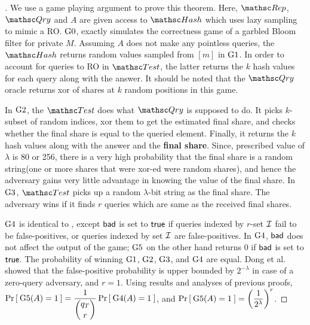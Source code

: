 \begin{proof}[]
We use a game playing argument to prove this theorem. Here, $\Rep$, $\Qry$ and $A$ are given access to $\Hash$ which uses lazy sampling to mimic a RO. $\text{G0}$, exactly simulates the correctness game of a garbled Bloom filter for private $M$. Assuming $A$ does not make any pointless queries, the $\Hash$ returns random values sampled from $[m]$ in $\text{G1}$. In order to account for queries to RO in $\Test$, the latter returns the $k$ hash values for each query along with the answer. It should be noted that the $\Qry$ oracle returns xor of shares at $k$ random positions in this game. 

In $\text{G2}$, the $\Test$ does what $\Qry$ is supposed to do. It picks $k$-subset of random indices, xor them to get the estimated final share, and checks whether the final share is equal to the queried element. Finally, it returns the $k$ hash values along with the answer and the \textbf{final share}. Since, prescribed value of $\lambda$ is 80 or 256, there is a very high probability that the final share is a random string(one or more shares that were xor-ed were random shares), and hence the adversary gains very little advantage in knowing the value of the final share. In $\text{G3}$, $\Test$ picks up a random $\lambda$-bit string as the final share. The adversary wins if it finds $r$ queries which are same as the received final shares.

$\text{G4}$ is identical to , except $\mathsf{bad}$ is set to $\mathsf{true}$ if queries indexed by $r$-set ${\cal I}$ fail to be false-positives, or queries indexed by set ${\cal I}$ are false-positives. In $\text{G4}$, $\mathsf{bad}$ does not affect the output of the game; $\text{G5}$ on the other hand returns 0 if $\mathsf{bad}$ is set to $\mathsf{true}$. The probability of winning $\text{G1}$, $\text{G2}$, $\text{G3}$, and $\text{G4}$ are equal. Dong et al. \cite{Dong} showed that the false-positive probability is upper bounded by $2^{-\lambda}$ in case of a zero-query adversary, and $r=1$.  Using results and analyses of previous proofs, $\Pr\left[\: \text{G5}(A)=1 \:\right] = \dfrac{1}{\dbinom{q_T}{r}}\Pr\left[\: \text{G4}(A)=1 \:\right]$, and $\Pr\left[\: \text{G5}(A) = 1 \:\right] = \left( \dfrac{1}{2^{\lambda}} \right)^r$.


\end{proof}
